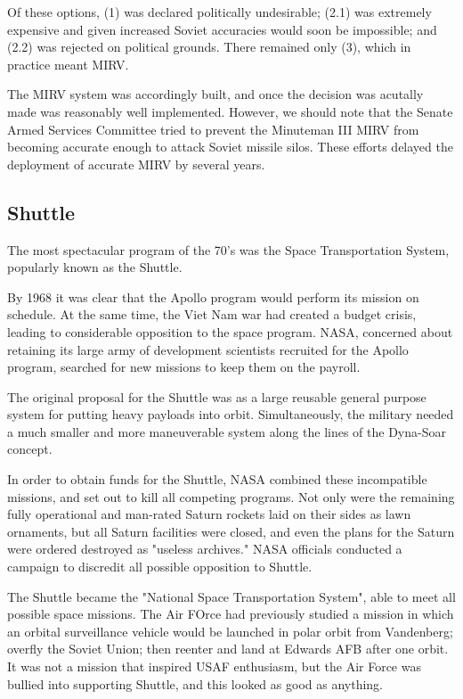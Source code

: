 \documentclass[a4paper,12pt]{book}
\begin{document}
Of these options, (1) was declared politically undesirable; (2.1) was extremely expensive and given increased Soviet accuracies would soon be impossible; and (2.2) was rejected on political grounds. There remained only (3), which in practice meant MIRV.

The MIRV system was accordingly built, and once the decision was acutally made was reasonably well implemented. However, we should note that the Senate Armed Services Committee tried to prevent the Minuteman III MIRV from becoming accurate enough to attack Soviet missile silos. These efforts delayed the deployment of accurate MIRV by several years.

\subsection{Shuttle}
The most spectacular program of the 70's was the Space Transportation System, popularly known as the Shuttle.

By 1968 it was clear that the Apollo program would perform its mission on schedule. At the same time, the Viet Nam war had created a budget crisis, leading to considerable opposition to the space program. NASA, concerned about retaining its large army of development scientists recruited for the Apollo program, searched for new missions to keep them on the payroll.

The original proposal for the Shuttle was as a large reusable general purpose system for putting heavy payloads into orbit. Simultaneously, the military needed a much smaller and more maneuverable system along the lines of the Dyna-Soar concept.

In order to obtain funds for the Shuttle, NASA combined these incompatible missions, and set out to kill all competing programs. Not only were the remaining fully operational and man-rated Saturn rockets laid on their sides as lawn ornaments, but all Saturn facilities were closed, and even the plans for the Saturn were ordered destroyed as "useless archives." NASA officials conducted a campaign to discredit all possible opposition to Shuttle.

The Shuttle became the "National Space Transportation System", able to meet all possible space missions. The Air FOrce had previously studied a mission in which an orbital surveillance vehicle would be launched in polar orbit from Vandenberg; overfly the Soviet Union; then reenter and land at Edwards AFB after one orbit. It was not a mission that inspired USAF enthusiasm, but the Air Force was bullied into supporting Shuttle, and this looked as good as anything.
\end{document}
